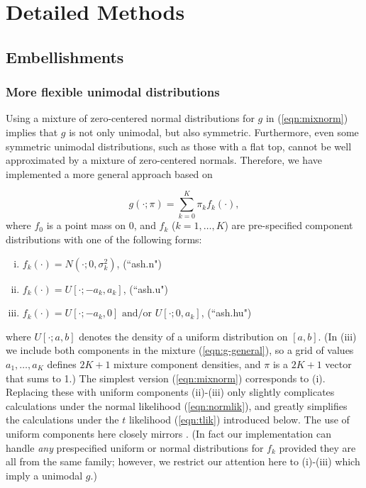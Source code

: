 \section*{Detailed Methods} \label{sec:implement}

\subsection*{Embellishments}

\subsubsection*{More flexible unimodal distributions}

Using a mixture of zero-centered normal distributions for $g$ in (\ref{eqn:mixnorm}) implies that $g$ is not only unimodal, but also symmetric.
Furthermore, even some symmetric unimodal distributions, such as those with a flat top, cannot be well approximated by a mixture of zero-centered normals.
 Therefore, we have implemented a more general approach based on

\begin{equation}
\label{eqn:g-general}
g(\cdot; \pi) = \sum_{k=0}^K \pi_k f_k(\cdot) ,
\end{equation}
where $f_0$ is a point mass on 0, and $f_k$ ($k=1,\dots,K$) are pre-specified component distributions with one of the following forms:

\begin{enumerate}
[(i)]
\item $f_k(\cdot) = N(\cdot; 0, \sigma^2_k)$, \qquad (``ash.n")
\item $f_k(\cdot) = U[\cdot; -a_k,a_k]$,  \qquad (``ash.u")
\item $f_k(\cdot) = U[\cdot; -a_k,0] \text{ and/or } U[\cdot; 0,a_k]$,  \qquad (``ash.hu")
\end{enumerate}
where $U[\cdot; a,b]$ denotes the density of a uniform distribution on $[a,b]$.
(In (iii) we include both components in the mixture (\ref{eqn:g-general}), so a grid of values $a_1,\dots,a_K$ defines $2K+1$ mixture component densities, 
and $\pi$ is a $2K+1$ vector that sums to 1.)
The simplest version (\ref{eqn:mixnorm}) corresponds to (i).
Replacing these with uniform components (ii)-(iii) only slightly complicates calculations
under the normal likelihood (\ref{eqn:normlik}), and greatly simplifies the calculations under the $t$ likelihood
(\ref{eqn:tlik}) introduced below. The use of uniform components here closely mirrors \cite{cordy1997deconvolution}.
(In fact our implementation can handle {\it any} prespecified uniform or normal distributions for $f_k$ provided they are all from the same family;
however, we restrict our attention here to (i)-(iii) which imply a unimodal $g$.)

